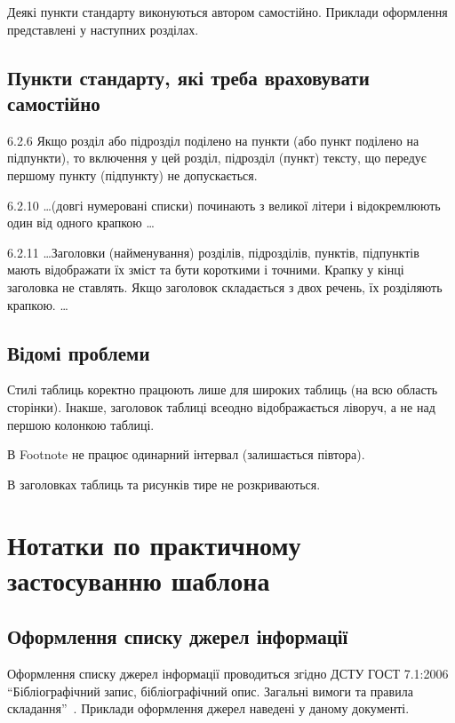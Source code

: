 Деякі пункти стандарту виконуються автором самостійно. Приклади оформлення представлені у наступних розділах.

\subsection{Пункти стандарту, які треба враховувати самостійно}

6.2.6 Якщо розділ або підрозділ поділено на пункти (або пункт поділено на підпункти), то включення у цей розділ, підрозділ (пункт) тексту, що передує першому пункту (підпункту) не допускається.

6.2.10 \dots (довгі нумеровані списки) починають з великої літери і відокремлюють один від одного крапкою \dots

6.2.11 \dots Заголовки (найменування) розділів, підрозділів, пунктів, підпунктів мають відображати їх зміст та бути короткими і точними. Крапку у кінці заголовка не ставлять. Якщо заголовок складається з двох речень, їх розділяють крапкою. \dots

\subsection{Відомі проблеми}

\begin{longEnumerate}
\item Стилі таблиць коректно працюють лише для широких таблиць (на всю область
сторінки). Інакше, заголовок таблиці всеодно відображається ліворуч, а не над
першою колонкою таблиці.
\item В Footnote не працює одинарний інтервал (залишається півтора). 
\item В заголовках таблиць та рисунків тире не розкриваються.
\end{longEnumerate}

\section{Нотатки по практичному застосуванню шаблона}
\subsection{Оформлення списку джерел інформації}

Оформлення списку джерел інформації проводиться згідно ДСТУ ГОСТ 7.1:2006
\enquote{Бібліографічний запис, бібліографічний опис. Загальні вимоги та правила
складання}~\cite{DSTU_GOST_7.1_2006}. Приклади оформлення джерел наведені у
даному документі.

